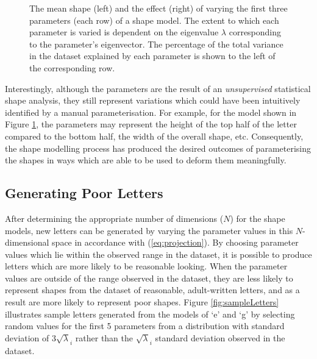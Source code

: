 \documentclass{sig-alternate}
\begin{document}
\begin{figure}[thpb]
\centering
{}
\caption[The mean shape and the effect of varying the first three parameters of
the shape model derived from PCA from the dataset of print `s'
shapes.]{\label{fig:deviations_sPrint}The mean shape (left) and the effect
    (right) of varying the first three parameters (each row) of a shape model.
     The extent to which each
parameter is varied is dependent on the eigenvalue $\lambda$ corresponding to
the parameter's eigenvector. The percentage of the total variance in the dataset
explained by each parameter is shown to the left of the corresponding row. }

\end{figure}

Interestingly, although the parameters are the result of an \emph{unsupervised}
statistical shape analysis, they still represent variations which could have
been intuitively identified by a manual parameterisation. For example, for the
model shown in Figure \ref{fig:deviations_sPrint}, the parameters may represent
the height of the top half of the letter compared to the bottom half, the width
of the overall shape, etc. Consequently, the shape modelling process has
produced the desired outcomes of parameterising the shapes in ways which are
able to be used to deform them meaningfully.


\subsection{Generating Poor Letters}

After determining the appropriate number of dimensions ($N$) for the shape
models, new letters can be generated by varying the parameter values in this
$N$-dimensional space in accordance with (\ref{eq:projection}). By choosing
parameter values which lie within the observed range in the dataset, it is
possible to produce letters which are more likely to be reasonable looking.
When the parameter values are outside of the range observed in the dataset, they
are less likely to represent shapes from the dataset of reasonable,
adult-written letters, and as a result are more likely to represent poor shapes.
Figure \ref{fig:sampleLetters} illustrates sample letters generated from the
models of `e' and `g' by selecting random values for the first 5 parameters 
from a distribution with
standard deviation of $3\sqrt\lambda_i$ rather than the $\sqrt\lambda_i$
standard deviation observed in the dataset.
\end{document}
